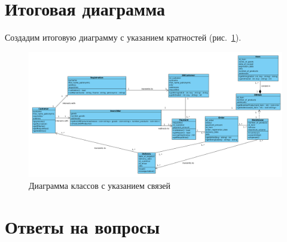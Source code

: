 \section{Итоговая диаграмма}
Создадим итоговую диаграмму с указанием кратностей
(рис.~\ref{fig:classes:link}).

\begin{figure}[h!tp]
	\centering
	\includegraphics[width=1\textwidth]{Screenshot from 2023-04-04 17-59-45}
	\caption{Диаграмма классов с указанием связей}
	\label{fig:classes:link}
\end{figure}


\clearpage

\section*{Ответы на вопросы}

